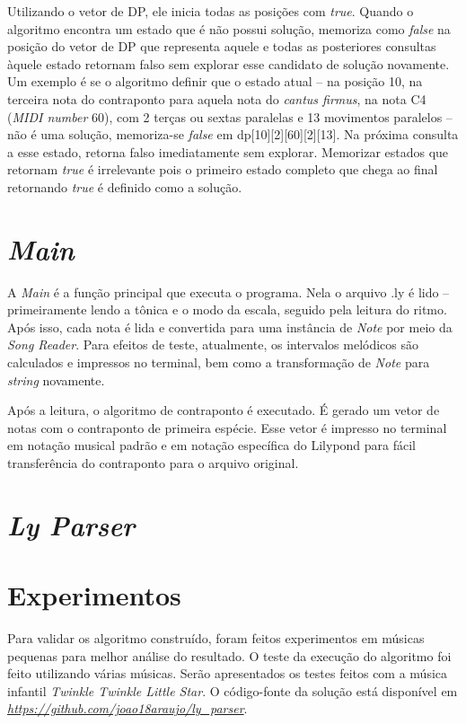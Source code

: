     Utilizando o vetor de DP, ele inicia todas as posições com \textit{true}. Quando o algoritmo encontra um estado que é não possui solução, memoriza como \textit{false} na posição do vetor de DP que representa aquele e todas as posteriores consultas àquele estado retornam falso sem explorar esse candidato de solução novamente. Um exemplo é se o algoritmo definir que o estado atual -- na posição 10, na terceira nota do contraponto para aquela nota do \textit{cantus firmus}, na nota C4 (\textit{MIDI number} 60), com 2 terças ou sextas paralelas e 13 movimentos paralelos -- não é uma solução, memoriza-se \textit{false} em dp[10][2][60][2][13]. Na próxima consulta a esse estado, retorna falso imediatamente sem explorar. Memorizar estados que retornam \textit{true} é irrelevante pois o primeiro estado completo que chega ao final retornando \textit{true} é definido como a solução.


  \section[\textit{Main}]{\textit{Main}}

    A \textit{Main} é a função principal que executa o programa. Nela o arquivo .ly é lido -- primeiramente lendo a tônica e o modo da escala, seguido pela leitura do ritmo. Após isso, cada nota é lida e convertida para uma instância de \textit{Note} por meio da \textit{Song Reader}. Para efeitos de teste, atualmente, os intervalos melódicos são calculados e impressos no terminal, bem como a transformação de \textit{Note} para \textit{string} novamente.

    Após a leitura, o algoritmo de contraponto é executado. É gerado um vetor de notas com o contraponto de primeira espécie. Esse vetor é impresso no terminal em notação musical padrão e em notação específica do Lilypond para fácil transferência do contraponto para o arquivo original.

  \section[\textit{Ly Parser}]{\textit{Ly Parser}}

  \section[Experimentos]{Experimentos}

    Para validar os algoritmo construído, foram feitos experimentos em músicas pequenas para melhor análise do resultado. O teste da execução do algoritmo foi feito utilizando várias músicas. Serão apresentados os testes feitos com a música infantil \textit{Twinkle Twinkle Little Star}. O código-fonte da solução está disponível em \textit{\url{https://github.com/joao18araujo/ly_parser}}.

